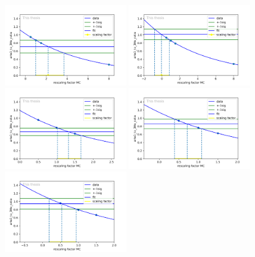 \begin{figure}
    \centering
    \includegraphics[width=0.48\textwidth]{figures/he3_rescaling/Bin_2_scaling.png}
    \includegraphics[width=0.48\textwidth]{figures/he3_rescaling/Bin_3_scaling.png}
    \includegraphics[width=0.48\textwidth]{figures/he3_rescaling/Bin_4_scaling.png}
    \includegraphics[width=0.48\textwidth]{figures/he3_rescaling/Bin_5_scaling.png}
    \includegraphics[width=0.48\textwidth]{figures/he3_rescaling/Bin_6_scaling.png}

\end{figure}
